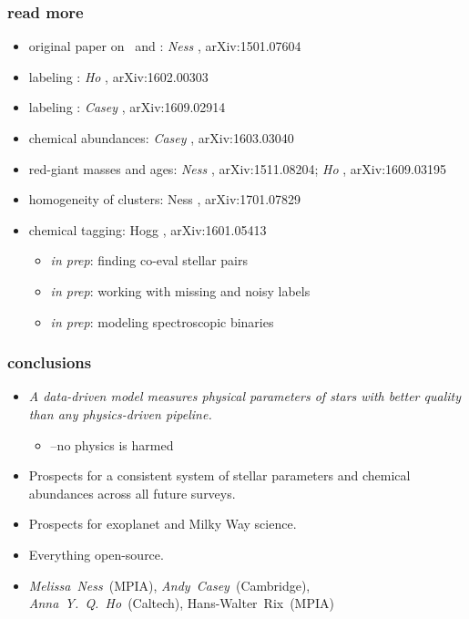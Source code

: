 \documentclass[pdftex]{beamer}
\newcommand{\conclusions}{%
\begin{frame}
  \frametitle{conclusions}
  \begin{itemize}
  \item \emph{A data-driven model measures physical parameters of stars with better quality than any physics-driven pipeline.}
    \begin{itemize}
    \item \tc\---no physics is harmed
    \end{itemize}
  \item Prospects for a consistent system of stellar parameters and chemical abundances across all future surveys.
  \item Prospects for exoplanet and Milky Way science.
  \item Everything open-source.
  \item \emph{Melissa~Ness}~(MPIA), \emph{Andy~Casey}~(Cambridge), \emph{Anna~Y.~Q.~Ho}~(Caltech), Hans-Walter~Rix~(MPIA)
  \end{itemize}
\end{frame}}
\begin{document}
\begin{frame}
  \frametitle{read more}
  \begin{itemize}
  \item original paper on \tc\ and \apogee: \emph{Ness} \etal, arXiv:1501.07604
  \item labeling : \emph{Ho} \etal, arXiv:1602.00303
  \item labeling : \emph{Casey} \etal, arXiv:1609.02914
  \item chemical abundances: \emph{Casey} \etal, arXiv:1603.03040
  \item red-giant masses and ages: \emph{Ness} \etal, arXiv:1511.08204; \emph{Ho} \etal, arXiv:1609.03195
  \item homogeneity of clusters: Ness \etal, arXiv:1701.07829
  \item chemical tagging: Hogg \etal, arXiv:1601.05413
    \begin{itemize}
    \item \textsl{in prep}: finding co-eval stellar pairs
    \item \textsl{in prep}: working with missing and noisy labels
    \item \textsl{in prep}: modeling spectroscopic binaries
    \end{itemize}
  \end{itemize}
\end{frame}

\conclusions
\end{document}
